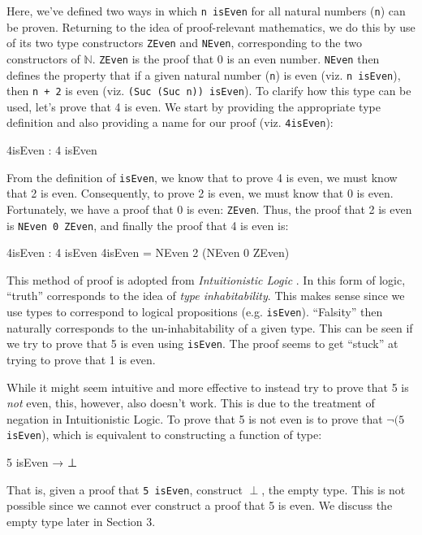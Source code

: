 \documentclass[12pt]{article}
\begin{document}
Here, we've defined two ways in which {\tt n isEven} for all natural numbers
({\tt n}) can be proven. Returning to the idea of proof-relevant mathematics,
we do this by use of its two type constructors {\tt ZEven} and {\tt NEven},
corresponding to the two constructors of \(\mathbb{N}\). {\tt ZEven} is the
proof that 0 is an even number. {\tt NEven} then defines the property that if
a given natural number ({\tt n}) is even (viz. {\tt n isEven}), then {\tt n + 2}
is even (viz. {\tt (Suc (Suc n)) isEven}). To clarify how this type can be used,
let's prove that 4 is even. We start by providing the appropriate type definition
and also providing a name for our proof (viz. {\tt 4isEven}):
\begin{center}
\begin{minipage}{0.5\textwidth}
\begin{code}
4isEven : 4 isEven
\end{code}
\end{minipage}
\end{center}
From the definition of {\tt isEven}, we know that to prove 4 is even, we must
know that 2 is even. Consequently, to prove 2 is even, we must know that 0 is
even. Fortunately, we have a proof that 0 is even: {\tt ZEven}. Thus, the proof
that 2 is even is {\tt NEven 0 ZEven}, and finally the proof that 4 is even is:
\begin{center}
\begin{minipage}{0.5\textwidth}
\begin{code}
4isEven : 4 isEven
4isEven = NEven 2 (NEven 0 ZEven)
\end{code}
\end{minipage}
\end{center}

This method of proof is adopted from {\em Intuitionistic Logic} \cite{}. In
this form of logic, ``truth'' corresponds to the idea of {\em type inhabitability}.
This makes sense since we use types to correspond to logical propositions
(e.g. {\tt isEven}). ``Falsity'' then naturally corresponds to the un-inhabitability
of a given type. This can be seen if we try to prove that 5 is even using
{\tt isEven}. The proof seems to get ``stuck'' at trying to prove that 1 is even.

While it might seem intuitive and more effective to instead try to prove that 5
is {\em not} even, this, however, also doesn't work. This is due to the
treatment of negation in Intuitionistic Logic. To prove that 5 is not even is
to prove that \(\neg (5\) {\tt isEven}), which is equivalent to constructing a
function of type:
\begin{center}
\begin{minipage}{0.2\textwidth}
\begin{code}
5 isEven → ⊥
\end{code}
\end{minipage}
\end{center}
That is, given a proof that {\tt 5 isEven}, construct \(\perp\), the empty type.
This is not possible since we cannot ever construct a proof that 5 is even. We
discuss the empty type later in Section 3.
\end{document}
